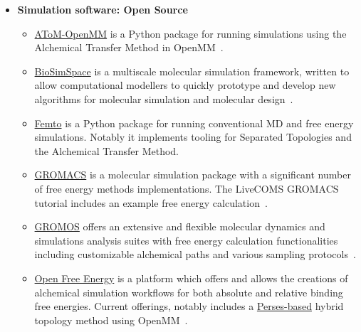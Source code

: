 \documentclass[9pt,bestpractices]{livecoms}
\begin{document}
\begin{itemize}
\begin{itemize}
	\item \href{https://www.charmm.org/}{CHARMM} has a variety of tools developed over the years. The PERT module can be used to define initial and final states and define the intermediate lambda points. FREN and BAR modules can be used to analyse the data after the MD run. Lambda-dynamics-based free energy calculation can be carried out using the BLOCK module. GPU optimized implementation of CHARMM's lambda dynamics is also implemented in the new package BLaDE~\cite{hayes2021blade}. A number of energy interpolation schemes have been implemented in the new GPU package apoCHARMM~\cite{prasad2025apocharmm}.
	\end{itemize}
\item [] \textbf{Simulation software: Open Source}
	\begin{itemize}
    \item \href{https://github.com/Gallicchio-Lab/AToM-OpenMM}{AToM-OpenMM} is a Python package for running simulations using the Alchemical Transfer Method in OpenMM~\cite{azimi2022relative, wu2021alchemical,gallicchio2008,gallicchio2025mutants}.    
    \item \href{https://biosimspace.org/}{BioSimSpace} is a multiscale molecular simulation framework, written to allow computational modellers to quickly prototype and develop new algorithms for molecular simulation and molecular design~\cite{hedges2019biosimspace, hedges2023suite}.
\item \href{https://github.com/Psivant/femto/tree/main}{Femto} is a Python package for running conventional MD and free energy simulations. Notably it implements tooling for Separated Topologies\cite{baumann2023broadening} and the Alchemical Transfer Method\cite{azimi2022relative,wu2021alchemical,gallicchio2008,gallicchio2025mutants}.
    \item 	\href{http://www.gromacs.org/}{GROMACS} is a molecular simulation package with a significant number of free energy methods implementations. The LiveCOMS GROMACS tutorial includes an example free energy calculation~\cite{lemkul2018From}.
	\item \href{http://www.gromos.net/}{GROMOS} offers an extensive and flexible molecular dynamics and simulations analysis suites with free energy calculation functionalities including customizable alchemical paths and various sampling protocols~\cite{schmid2012architecture, kunz2012new, eichenberger2011gromos}.
    \item     \href{https://openfree.energy/}{Open Free Energy} is a platform which offers and allows the creations of alchemical simulation workflows for both absolute and relative binding free energies. Current offerings, notably includes a \href{https://github.com/choderalab/perses/tree/main/perses}{Perses-based} hybrid topology method using OpenMM~\cite{alibay_2025_17258732}.

\end{itemize}
\end{itemize}
\end{document}
